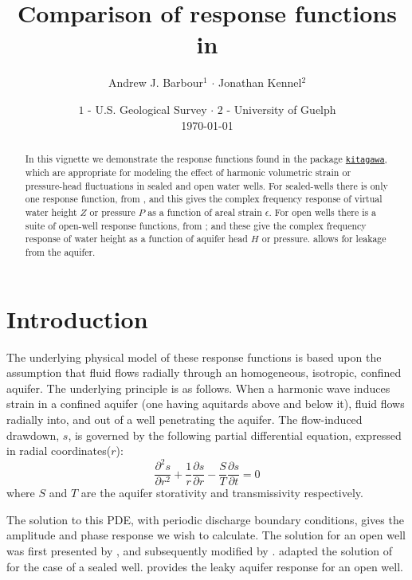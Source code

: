 \documentclass[12pt]{article}\usepackage[]{graphicx}\usepackage[]{xcolor}
\author{Andrew J. Barbour$^1$ $\cdot$ Jonathan Kennel$^2$}
\title{Comparison of response functions in \kit{}}
\date{%
    \footnotesize{$1$ - U.S. Geological Survey $\cdot$ $2$ - University of Guelph}\\[2ex]%
    \today
}
\begin{document}
%
\newcommand{\SC}[1]{\textsc{#1}}
\newcommand{\Rcmd}[1]{\texttt{#1}}
\newcommand{\kit}[0]{\href{https://github.com/abarbour/kitagawa/}{\color{blue}\Rcmd{kitagawa}}}
\newcommand{\bidxa}[1]{\index{#1}{\textbf{#1}}} 
\newcommand{\bidxb}[2]{\index{#2}{\textbf{#1}}} 
\newcommand{\idxa}[1]{\index{#1}{#1}} 
\newcommand{\idxb}[2]{\index{#2}{#1}} 
%
\maketitle
%
\begin{abstract}
In this vignette we demonstrate the response functions found in 
the package
\kit{}, which are appropriate for modeling the effect of
harmonic volumetric strain or pressure-head fluctuations in
sealed and open water wells.
For sealed-wells there is only one response function, from
\citet{kitagawa2011}, and this gives the complex frequency response of
virtual water height $Z$ or pressure $P$ as a function of
areal %
strain $\epsilon$.
For open wells there is
a suite of open-well response functions, from 
\citet{cooper1965, hsieh1987, rojstaczer1988, liu1989, wang2018}; and
these give the complex frequency response of
water height as a function of aquifer head $H$ or pressure. \citet{wang2018}
allows for leakage from the aquifer.
\end{abstract}
%
\tableofcontents

\section{Introduction}

 The underlying physical model of these response functions
 is based upon the assumption that fluid flows radially
 through an homogeneous, isotropic, confined aquifer.
%
 The underlying principle is as follows.  When a harmonic wave induces
 strain in a confined aquifer (one having aquitards above and below it), 
 fluid flows radially into, and out of a well penetrating the aquifer.
 The flow-induced drawdown, $s$, is governed by the following 
 partial differential equation, expressed in radial coordinates($r$):
\begin{equation}
 \frac{\partial^2 s}{\partial r^2} + \frac{1}{r} 
 \frac{\partial s}{ \partial r} - \frac{S}{T}\frac{\partial s}{\partial t} = 0
\end{equation}
 where $S$ and $T$ are the aquifer storativity and transmissivity respectively.
 
 The solution to this PDE, with periodic discharge boundary conditions,
 gives the amplitude and phase response we wish to calculate.
 The solution  for an open well was first presented by
 \citet{cooper1965}, and subsequently modified by \citet{rojstaczer1988, liu1989}.
 \citet{kitagawa2011} adapted the solution
 of \citet{hsieh1987} for the case of a sealed well. 
 \citet{wang2018} provides the leaky aquifer response for an open well.
 
\end{document}
